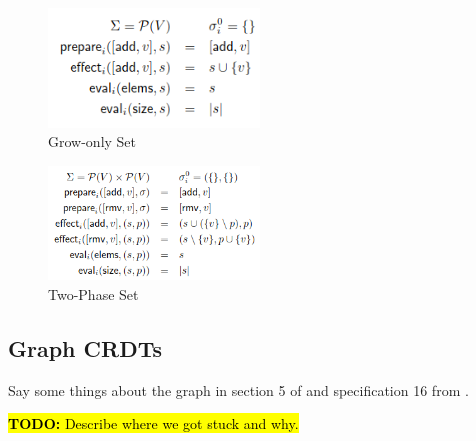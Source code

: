 \documentclass{article}
\newcommand{\TODO}[1]{\hl{\textbf{TODO:} #1}\xspace}
\begin{document}
\begin{figure}[h]
    \centering
    \includegraphics[width=0.5\textwidth]{grow-only-set-definition}
    \caption{Grow-only Set}
    \label{fig:gset-def}
\end{figure}

\begin{figure}[h]
    \centering
    \includegraphics[width=0.5\textwidth]{2pset-definition}
    \caption{Two-Phase Set}
    \label{fig:2pset-def}
\end{figure}

\subsection{Graph CRDTs}

Say some things about the graph in section 5 of
\cite{shapiro2011conflict} and specification 16 from
\cite{shapiro2011comprehensive}.

\TODO{Describe where we got stuck and why.}



\end{document}
